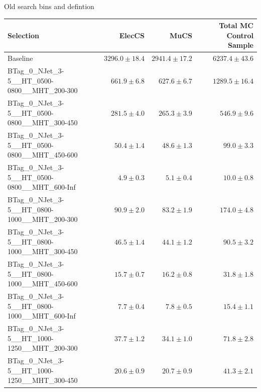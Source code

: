 \documentclass{beamer}
\begin{document}
\begin{frame}
  \begin{center}
    {\Large Old search bins and  \HT \NJets defintion}
  \end{center}
\end{frame}
\begin{frame}
\tiny
\begin{tabular}{lrrr}
\toprule

                                                Selection  &                   ElecCS  &                     MuCS  &          Total MC Control Sample  \\ 
\midrule
                                             Baseline &           $3296.0\pm18.4$&           $2941.4\pm17.2$&               $6237.4\pm43.6$ \\ 
      BTag\_0\_NJet\_3-5\_\_HT\_0500-0800\_\_MHT\_200-300 &             $661.9\pm6.8$&             $627.6\pm6.7$&               $1289.5\pm16.4$ \\ 
      BTag\_0\_NJet\_3-5\_\_HT\_0500-0800\_\_MHT\_300-450 &             $281.5\pm4.0$&             $265.3\pm3.9$&                 $546.9\pm9.6$ \\ 
      BTag\_0\_NJet\_3-5\_\_HT\_0500-0800\_\_MHT\_450-600 &              $50.4\pm1.4$&              $48.6\pm1.3$&                  $99.0\pm3.3$ \\ 
      BTag\_0\_NJet\_3-5\_\_HT\_0500-0800\_\_MHT\_600-Inf &               $4.9\pm0.3$&               $5.1\pm0.4$&                  $10.0\pm0.8$ \\ 
      BTag\_0\_NJet\_3-5\_\_HT\_0800-1000\_\_MHT\_200-300 &              $90.9\pm2.0$&              $83.2\pm1.9$&                 $174.0\pm4.8$ \\ 
      BTag\_0\_NJet\_3-5\_\_HT\_0800-1000\_\_MHT\_300-450 &              $46.5\pm1.4$&              $44.1\pm1.2$&                  $90.5\pm3.2$ \\ 
      BTag\_0\_NJet\_3-5\_\_HT\_0800-1000\_\_MHT\_450-600 &              $15.7\pm0.7$&              $16.2\pm0.8$&                  $31.8\pm1.8$ \\ 
      BTag\_0\_NJet\_3-5\_\_HT\_0800-1000\_\_MHT\_600-Inf &               $7.7\pm0.4$&               $7.8\pm0.5$&                  $15.4\pm1.1$ \\ 
      BTag\_0\_NJet\_3-5\_\_HT\_1000-1250\_\_MHT\_200-300 &              $37.7\pm1.2$&              $34.1\pm1.0$&                  $71.8\pm2.8$ \\ 
      BTag\_0\_NJet\_3-5\_\_HT\_1000-1250\_\_MHT\_300-450 &              $20.6\pm0.9$&              $20.7\pm0.9$&                  $41.3\pm2.1$ \\ 

\end{tabular}
\end{frame}
\end{document}
